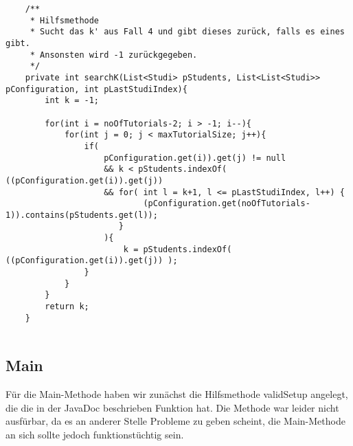 \documentclass{pi2}
\begin{document}
\begin{lstlisting}
	/**
	 * Hilfsmethode
	 * Sucht das k' aus Fall 4 und gibt dieses zurück, falls es eines gibt.
	 * Ansonsten wird -1 zurückgegeben.
	 */
	private int searchK(List<Studi> pStudents, List<List<Studi>> pConfiguration, int pLastStudiIndex){
		int k = -1;
		
		for(int i = noOfTutorials-2; i > -1; i--){
			for(int j = 0; j < maxTutorialSize; j++){
				if(
					pConfiguration.get(i)).get(j) != null
					&& k < pStudents.indexOf( ((pConfiguration.get(i)).get(j))
					&& for( int l = k+1, l <= pLastStudiIndex, l++) {
							(pConfiguration.get(noOfTutorials-1)).contains(pStudents.get(l));
					   }
					){
						k = pStudents.indexOf( ((pConfiguration.get(i)).get(j)) );
				}
			}
		}
		return k;
	}
	
\end{lstlisting}

\subsection{Main}

Für die Main-Methode haben wir zunächst die Hilfsmethode validSetup angelegt, die die in der JavaDoc beschrieben Funktion hat. Die Methode war leider nicht ausfürbar, da es an anderer Stelle Probleme zu geben scheint, die Main-Methode an sich sollte jedoch funktionstüchtig sein.
\end{document}
